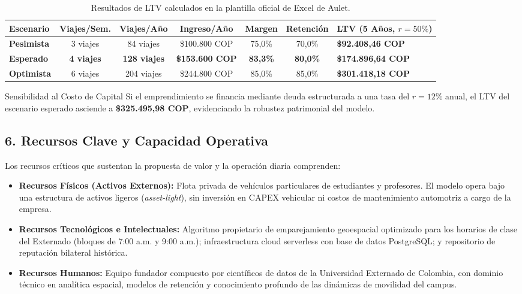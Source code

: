 \documentclass[11pt,a4paper]{article}
\begin{document}
\begin{table}[h!]
\centering
\small
\renewcommand{\arraystretch}{1.3}
\begin{tabularx}{\textwidth}{lcccccX}
\toprule
\textbf{Escenario} & \textbf{Viajes/Sem.} & \textbf{Viajes/A\~no} & \textbf{Ingreso/A\~no} & \textbf{Margen} & \textbf{Retenci\'on} & \textbf{LTV (5 A\~nos, $r=50\%$)} \\
\midrule
\textbf{Pesimista} & 3 viajes & 84 viajes & \$100.800 COP & 75,0\% & 70,0\% & \textbf{\$92.408,46 COP} \\
\textbf{Esperado} & \textbf{4 viajes} & \textbf{128 viajes} & \textbf{\$153.600 COP} & \textbf{83,3\%} & \textbf{80,0\%} & \textbf{\$174.896,64 COP} \\
\textbf{Optimista} & 6 viajes & 204 viajes & \$244.800 COP & 85,0\% & 85,0\% & \textbf{\$301.418,18 COP} \\
\bottomrule
\end{tabularx}
\caption{Resultados de LTV calculados en la plantilla oficial de Excel de Aulet.}
\label{tab:ltv}
\end{table}

\begin{kbibox}{Sensibilidad al Costo de Capital}
Si el emprendimiento se financia mediante deuda estructurada a una tasa del $r = 12\%$ anual, el LTV del escenario esperado asciende a \textbf{\$325.495,98 COP}, evidenciando la robustez patrimonial del modelo.
\end{kbibox}

\subsection{6. Recursos Clave y Capacidad Operativa}
Los recursos cr\'iticos que sustentan la propuesta de valor y la operaci\'on diaria comprenden:
\begin{itemize}[leftmargin=*]
    \item \textbf{Recursos F\'isicos (Activos Externos):} Flota privada de veh\'iculos particulares de estudiantes y profesores. El modelo opera bajo una estructura de activos ligeros (\textit{asset-light}), sin inversi\'on en CAPEX vehicular ni costos de mantenimiento automotriz a cargo de la empresa.
    \item \textbf{Recursos Tecnol\'ogicos e Intelectuales:} Algoritmo propietario de emparejamiento geoespacial optimizado para los horarios de clase del Externado (bloques de 7:00 a.m. y 9:00 a.m.); infraestructura cloud serverless con base de datos PostgreSQL; y repositorio de reputaci\'on bilateral hist\'orica.
    \item \textbf{Recursos Humanos:} Equipo fundador compuesto por cient\'ificos de datos de la Universidad Externado de Colombia, con dominio t\'ecnico en anal\'itica espacial, modelos de retenci\'on y conocimiento profundo de las din\'amicas de movilidad del campus.
\end{itemize}
\end{document}
